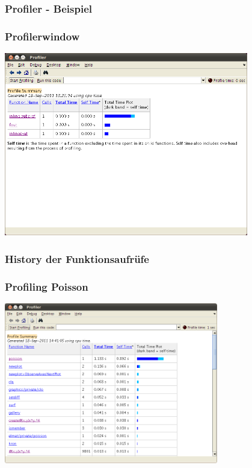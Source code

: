 \documentclass[hyperref={xetex}]{beamer}
\begin{document}
\begin{frame}[fragile]\frametitle{Profiler - Beispiel}


\end{frame}

\begin{frame}[fragile]\frametitle{Profilerwindow}
\begin{center}
\includegraphics[width=0.8\textwidth]{./figures/profilertest}
\end{center}
\end{frame}

\begin{frame}[fragile]\frametitle{History der Funktionsaufrüfe}

\end{frame}

\begin{frame}[fragile]\frametitle{Profiling Poisson}

\begin{center}
\includegraphics[width=0.7\textwidth]{./figures/profile_poisson}
\end{center}
\end{frame}
\end{document}
